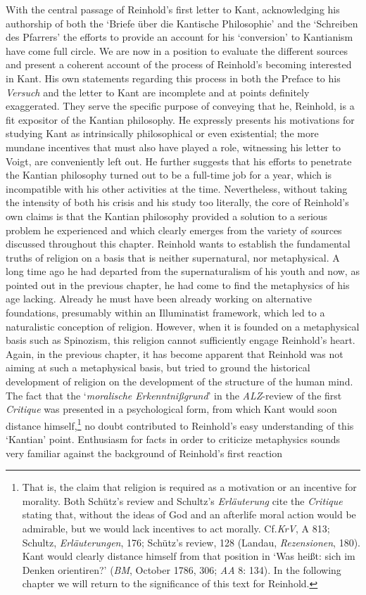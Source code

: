 With the central passage of Reinhold's first letter to Kant, acknowledging his authorship of both the `Briefe \"{u}ber die Kantische Philosophie' and the `Schreiben des Pfarrers' the efforts to provide an account for his `conversion' to Kantianism have come full circle. We are now in a position to evaluate the different sources and present a coherent account of the process of Reinhold's becoming interested in Kant. His own statements regarding this process in both the Preface to his \textit{Versuch} and the letter to Kant are incomplete and at points definitely exaggerated. They serve the specific purpose of conveying that he, Reinhold, is a fit expositor of the Kantian philosophy. He expressly presents his motivations for studying Kant as intrinsically philosophical or even existential; the more mundane incentives that must also have played a role, witnessing his letter to Voigt, are conveniently left out. He further suggests that his efforts to penetrate the Kantian philosophy turned out to be a full{-}time job for a year, which is incompatible with his other activities at the time. Nevertheless, without taking the intensity of both his crisis and his study too literally, the core of Reinhold's own claims is that the Kantian philosophy provided a solution to a serious problem he experienced and which clearly emerges from the variety of sources discussed throughout this chapter. Reinhold wants to establish the fundamental truths of religion on a basis that is neither supernatural, nor metaphysical. A long time ago he had departed from the supernaturalism of his youth and now, as pointed out in the previous chapter, he had come to find the metaphysics of his age lacking. Already he must have been already working on alternative foundations, presumably within an Illuminatist framework, which led to a naturalistic conception of religion. However, when it is founded on a metaphysical basis such as Spinozism, this religion cannot sufficiently engage Reinhold's heart. Again, in the previous chapter, it has become apparent that Reinhold was not aiming at such a metaphysical basis, but tried to ground the historical development of religion on the development of the structure of the human mind. The fact that the `\textit{moralische Erkenntni\ss{}grund}' in the \textit{ALZ}{-}review of the first \textit{Critique} was presented in a psychological form, from which Kant would soon distance himself,\footnote{ That is, the claim that religion is required as a motivation or an incentive for morality. Both Sch\"{u}tz's review and Schultz's \textit{Erl\"{a}uterung }cite the \textit{Critique }stating that, without the ideas of God and an afterlife moral action would be admirable, but we would lack incentives to act morally. Cf.\textit{KrV}, A 813; Schultz, \textit{Erl\"{a}uterungen}, 176; Sch\"{u}tz's review, 128 (Landau, \textit{Rezensionen}, 180). Kant would clearly distance himself from that position in `Was hei\ss{}t: sich im Denken orientiren?' (\textit{BM}, October 1786, 306; \textit{AA} 8: 134). In the following chapter we will return to the significance of this text for Reinhold. } no doubt contributed to Reinhold's easy understanding of this `Kantian' point. Enthusiasm for facts in order to criticize metaphysics sounds very familiar against the background of Reinhold's first reaction 